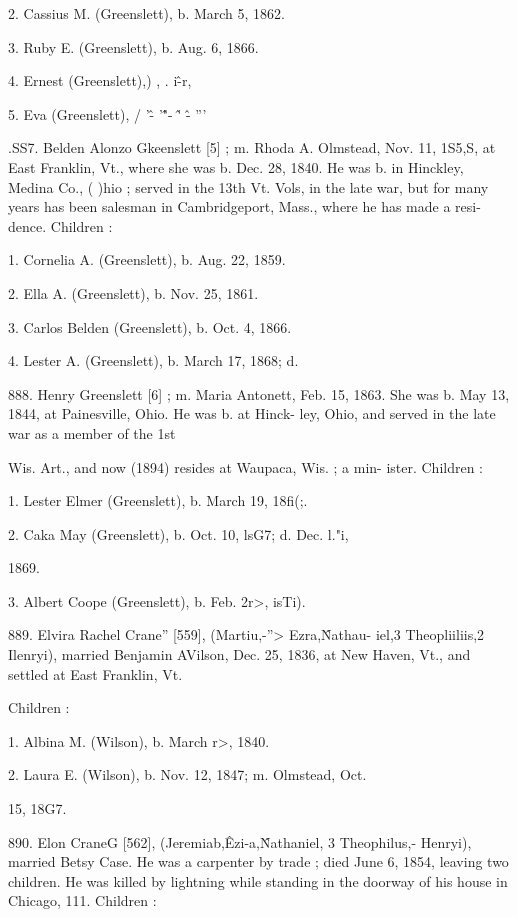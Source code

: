 \documentclass{book}
\begin{document}
2. Cassius M. (Greenslett), b. March 5, 1862. 

3. Ruby E. (Greenslett), b. Aug. 6, 1866. 

4. Ernest (Greenslett),) , .  i\^-r, 

5. Eva (Greenslett), / '\^- '\^"- \^' \^- ''' 

.SS7. Belden Alonzo Gkeenslett [5] ; m. Rhoda A. Olmstead, Nov. 
11, 1S5,S, at East Franklin, Vt., where she was b. Dec. 28, 
1840. He was b. in Hinckley, Medina Co., ( )hio ; served in the 
13th Vt. Vols, in the late war, but for many years has been 
salesman in Cambridgeport, Mass., where he has made a resi- 
dence. Children : 

1. Cornelia A. (Greenslett), b. Aug. 22, 1859. 

2. Ella A. (Greenslett), b. Nov. 25, 1861. 

3. Carlos Belden (Greenslett), b. Oct. 4, 1866. 

4. Lester A. (Greenslett), b. March 17, 1868; d. 

888. Henry Greenslett [6] ; m. Maria Antonett, Feb. 15, 1863. She 
was b. May 13, 1844, at Painesville, Ohio. He was b. at Hinck- 
ley, Ohio, and served in the late war as a member of the 1st 




Wis. Art., and now (1894) resides at Waupaca, Wis. ; a min- 
ister. Children : 

1. Lester Elmer (Greenslett), b. March 19, 18fi(;. 

2. Caka May (Greenslett), b. Oct. 10, lsG7; d. Dec. l."i, 

1869. 

3. Albert Coope (Greenslett), b. Feb. 2r>, isTi). 

889. Elvira Rachel Crane'' [559], (Martiu,-''> Ezra,\^ Nathau- 
iel,3 Theopliiliis,2 Ilenryi), married Benjamin AVilson, Dec. 25, 
1836, at New Haven, Vt., and settled at East Franklin, Vt. 

Children : 

1. Albina M. (Wilson), b. March r>, 1840. 

2. Laura E. (Wilson), b. Nov. 12, 1847; m.  Olmstead, Oct. 

15, 18G7. 

890. Elon CraneG [562], (Jeremiab,\^ Ezi-a,\^ Nathaniel, 3 
Theophilus,- Henryi), married Betsy Case. He was a carpenter 
by trade ; died June 6, 1854, leaving two children. He was 
killed by lightning while standing in the doorway of his house in 
Chicago, 111. Children : 
\end{document}

